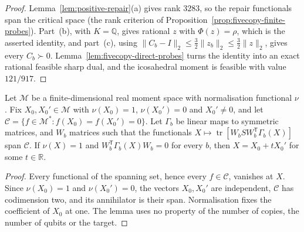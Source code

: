 \begin{proof}
Lemma~\ref{lem:positive-repair}(a) gives rank $3283$, so the repair
functionals span the critical space (the rank criterion of
Proposition~\ref{prop:fivecopy-finite-probes}). Part~(b), with $K=\mathbb Q$,
gives rational $z$ with $\Phi(z)=\rho$, which is the asserted identity, and
part~(c), using $\|C_b-I\|_2\le\tfrac32\|z_b\|_2\le\tfrac32\|z\|_2$, gives every
$C_b\succ0$. Lemma~\ref{lem:fivecopy-direct-probes} turns
the identity into an exact rational feasible sharp dual, and the
icosahedral moment is feasible with value $121/917$.
\end{proof}

\begin{lemma}
\label{lem:fivecopy-tangent-line}
Let $\mathcal M$ be a finite-dimensional real moment space with normalisation
functional $\nu$. Fix $X_0,X_0'\in\mathcal M$ with
$\nu(X_0)=1$, $\nu(X_0')=0$ and $X_0'\ne0$, and let
$\mathcal C=\{f\in\mathcal M^*:f(X_0)=f(X_0')=0\}$. Let $\Gamma_b$ be
linear maps to symmetric matrices, and $W_b$ matrices such that the
functionals $X\mapsto\operatorname{tr}[W_bSW_b^{\mathsf T}\Gamma_b(X)]$
span $\mathcal C$. If $\nu(X)=1$ and
$W_b^{\mathsf T}\Gamma_b(X)W_b=0$ for every $b$, then
$X=X_0+tX_0'$ for some $t\in\mathbb R$.
\end{lemma}
\begin{proof}
Every functional of the spanning set, hence every $f\in\mathcal C$,
vanishes at $X$. Since
$\nu(X_0)=1$ and $\nu(X_0')=0$, the vectors $X_0,X_0'$ are independent,
$\mathcal C$ has codimension two, and its annihilator is their span.
Normalisation fixes the coefficient of $X_0$ at one.
The lemma uses no property of the number of copies, the number of qubits or the target.
\end{proof}

